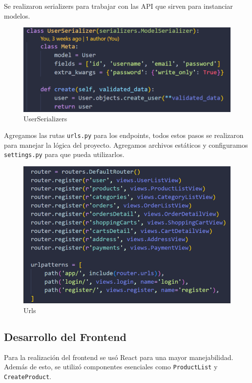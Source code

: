 \documentclass[conference]{IEEEtran}
\begin{document}
Se realizaron serializers para trabajar con las API que sirven para instanciar modelos.

\begin{figure}[htbp]
    \centering
    \includegraphics[width=\linewidth]{img/serializers.png}
    \caption{UserSerializers}
    \label{fig:etiqueta}
\end{figure}


Agregamos las rutas \texttt{urls.py} para los endpoints, todos estos pasos se realizaron para manejar la lógica del proyecto. Agregamos archivos estáticos y configuramos \texttt{settings.py} para que pueda utilizarlos.

\begin{figure}[htbp]
    \centering
    \includegraphics[width=\linewidth]{img/url.png}
    \caption{Urls}
    \label{fig:etiqueta}
\end{figure}

\subsection{Desarrollo del Frontend}
Para la realización del frontend se usó React para una mayor manejabilidad. Además de esto, se utilizó componentes esenciales como \texttt{ProductList} y \texttt{CreateProduct}.
\end{document}
